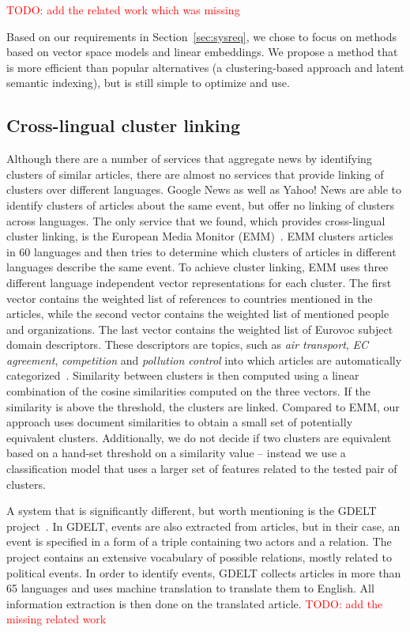 \documentclass[twoside,11pt]{article}
\newcommand{\todo}[1]{\textcolor{red}{TODO: #1}}
\begin{document}
\todo{add the related work which was missing}

Based on our requirements in Section~\ref{sec:sysreq}, we chose to focus on methods based on vector space models and linear embeddings. We propose a method that is more efficient than popular alternatives (a clustering-based approach and latent semantic indexing), but is still simple to optimize and use.

\subsection{Cross-lingual cluster linking}

Although there are a number of services that aggregate news by identifying clusters of similar articles, there are almost no services that provide linking of clusters over different languages. Google News as well as Yahoo! News are able to identify clusters of articles about the same event, but offer no linking of clusters across languages. The only service that we found, which provides cross-lingual cluster linking, is the European Media Monitor (EMM)~\cite{pouliquen2008story,Steinberger2008}. EMM clusters articles in 60 languages and then tries to determine which clusters of articles in different languages describe the same event. To achieve cluster linking, EMM uses three different language independent vector representations for each cluster. The first vector contains the weighted list of references to countries mentioned in the articles, while the second vector contains the weighted list of mentioned people and organizations. The last vector contains the weighted list of Eurovoc subject domain descriptors. These descriptors are topics, such as \emph{air transport}, \emph{EC agreement}, \emph{competition} and \emph{pollution control} into which articles are automatically categorized~. Similarity between clusters is then computed using a linear combination of the cosine similarities computed on the three vectors. If the similarity is above the threshold, the clusters are linked. Compared to EMM, our approach uses document similarities to obtain a small set of potentially equivalent clusters. Additionally, we do not decide if two clusters are equivalent based on a hand-set threshold on a similarity value -- instead we use a classification model that uses a larger set of features related to the tested pair of clusters.

A system that is significantly different, but worth mentioning is the GDELT project~\cite{Leetaru2013Gdelt}. In GDELT, events are also extracted from articles, but in their case, an event is specified in a form of a triple containing two actors and a relation. The project contains an extensive vocabulary of possible relations, mostly related to political events. In order to identify events, GDELT collects articles in more than 65 languages and uses machine translation to translate them to English. All information extraction is then done on the translated article.
\todo{add the missing related work}
\end{document}
